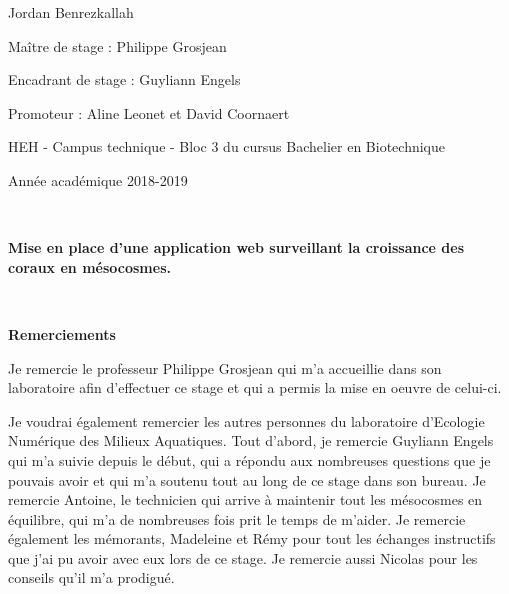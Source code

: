 \documentclass[]{report}
\begin{document}
\begin{centering}
\vspace{1 cm}

\Large

Jordan Benrezkallah

\vspace{2 cm}

\normalsize
Maître de stage : Philippe Grosjean

Encadrant de stage : Guyliann Engels

Promoteur : Aline Leonet et David Coornaert


\vspace{3.5 cm}

\normalsize
HEH - Campus technique -
Bloc 3 du cursus Bachelier en Biotechnique

Année académique 2018-2019

\end {centering}

\newpage

\null
\newpage

\begin{centering}



\textcolor{white}{.}





\vfill

\huge 
{\bf Mise en place d'une application web surveillant la croissance des coraux en mésocosmes.}

\vfill


\end {centering}

\null
\newpage

\textcolor{white}{.}

\Huge 
{\bf Remerciements} \vspace{1 cm}

\normalsize
Je remercie le professeur Philippe Grosjean qui m'a accueillie dans son
laboratoire afin d'effectuer ce stage et qui a permis la mise en oeuvre
de celui-ci.

Je voudrai également remercier les autres personnes du laboratoire
d'Ecologie Numérique des Milieux Aquatiques. Tout d'abord, je remercie
Guyliann Engels qui m'a suivie depuis le début, qui a répondu aux
nombreuses questions que je pouvais avoir et qui m'a soutenu tout au
long de ce stage dans son bureau. Je remercie Antoine, le technicien qui
arrive à maintenir tout les mésocosmes en équilibre, qui m'a de
nombreuses fois prit le temps de m'aider. Je remercie également les
mémorants, Madeleine et Rémy pour tout les échanges instructifs que j'ai
pu avoir avec eux lors de ce stage. Je remercie aussi Nicolas pour les
conseils qu'il m'a prodigué.
\end{document}
